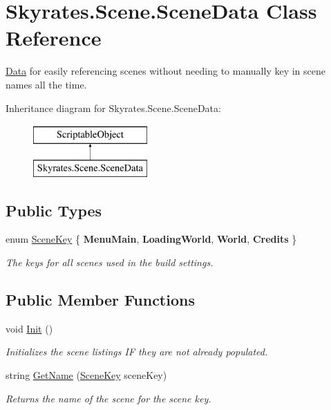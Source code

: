 \hypertarget{class_skyrates_1_1_scene_1_1_scene_data}{\section{Skyrates.\-Scene.\-Scene\-Data Class Reference}
\label{class_skyrates_1_1_scene_1_1_scene_data}
}


\hyperlink{namespace_skyrates_1_1_data}{Data} for easily referencing scenes without needing to manually key in scene names all the time.  


Inheritance diagram for Skyrates.\-Scene.\-Scene\-Data\-:\begin{figure}[H]
\begin{center}
\leavevmode
\includegraphics[height=2.000000cm]{class_skyrates_1_1_scene_1_1_scene_data}
\end{center}
\end{figure}
\subsection*{Public Types}
\begin{DoxyCompactItemize}
\item 
enum \hyperlink{class_skyrates_1_1_scene_1_1_scene_data_a466c9423ed3d053f5513e19abcf76b75}{Scene\-Key} \{ {\bfseries Menu\-Main}, 
{\bfseries Loading\-World}, 
{\bfseries World}, 
{\bfseries Credits}
 \}
\begin{DoxyCompactList}\small\item\em The keys for all scenes used in the build settings. \end{DoxyCompactList}\end{DoxyCompactItemize}
\subsection*{Public Member Functions}
\begin{DoxyCompactItemize}
\item 
void \hyperlink{class_skyrates_1_1_scene_1_1_scene_data_a6be189a5a5541f2e3432b1cc4ead7568}{Init} ()
\begin{DoxyCompactList}\small\item\em Initializes the scene listings I\-F they are not already populated. \end{DoxyCompactList}\item 
string \hyperlink{class_skyrates_1_1_scene_1_1_scene_data_afd4a3563ba6c8fdcdc4cc8b9b3087c02}{Get\-Name} (\hyperlink{class_skyrates_1_1_scene_1_1_scene_data_a466c9423ed3d053f5513e19abcf76b75}{Scene\-Key} scene\-Key)
\begin{DoxyCompactList}\small\item\em Returns the name of the scene for the scene key. \end{DoxyCompactList}\end{DoxyCompactItemize}
